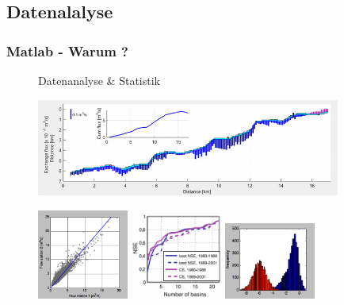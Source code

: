     \subsection{Datenalalyse}
    \begin{frame}
      \frametitle{Matlab - Warum ?}

      \vspace{-0.8cm}

      \begin{figure}
        Datenanalyse \& Statistik \par \vspace{0.4cm}
        \includegraphics[width=10.0cm]{visualisierung2.png}
      \end{figure}

      \vspace{-0.5cm}

      \begin{figure}
        \includegraphics[width=3.0cm]{visualisierung3.png}
        \hspace{0.5cm}
        \includegraphics[width=3.0cm]{visualisierung5.png}
        \hspace{0.5cm}
        \includegraphics[width=3.0cm]{visualisierung4.png}
      \end{figure}
    \end{frame}

